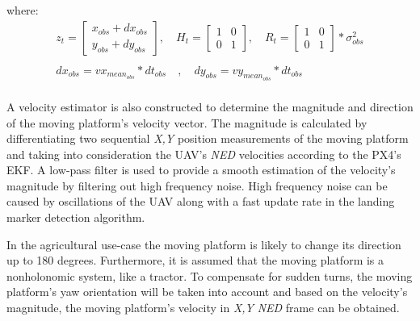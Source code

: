 \documentclass[conference]{IEEEtran}
\begin{document}


where:
\begin{equation*}
    \begin{array}{l}
    z_{t} = \begin{bmatrix} 
                x_{obs} + dx_{obs} \\ 
                y_{obs} + dy_{obs}
                \end{bmatrix}, \quad 


    
    H_{t}= \begin{bmatrix} 
                1 & 0 \\ 
                0 & 1
                \end{bmatrix}, \quad
    R_{t} = \begin{bmatrix} 
                1 & 0 \\ 
                0 & 1
                \end{bmatrix}*\sigma^{2}_{obs}  \\ \\
                
dx_{obs} = vx_{mean_{obs}} * dt_{obs} \quad , \quad
    dy_{obs} = vy_{mean_{obs}} * dt_{obs} \quad \\
          
    \end{array}
\end{equation*}

A velocity estimator is also constructed to determine the magnitude
and direction of the moving platform's velocity vector. The magnitude
is calculated by differentiating two sequential \emph{X,Y} position
measurements of the moving platform and taking into consideration the
UAV's \emph{NED} velocities according to the PX4's EKF. A low-pass
filter is used to provide a smooth estimation of the velocity's
magnitude by filtering out high frequency noise. High frequency noise
can be caused by oscillations of the UAV along with a fast update rate
in the landing marker detection algorithm.  %

In the agricultural use-case the moving platform is likely to change
its direction up to 180 degrees. Furthermore, it is assumed that the
moving platform is a nonholonomic system, like a tractor. To
compensate for sudden turns, the moving platform's yaw orientation
will be taken into account and based on the velocity's magnitude, the
moving platform's velocity in \emph{X,Y} \emph{NED} frame can be obtained.
\end{document}

